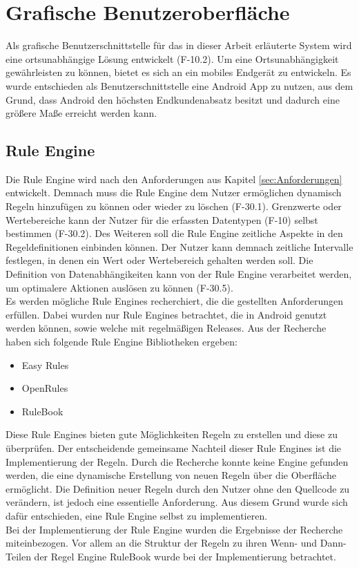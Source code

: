 \section{Grafische Benutzeroberfläche} %
Als grafische Benutzerschnittstelle für das in dieser Arbeit erläuterte System wird eine ortsunabhängige Lösung entwickelt (F-10.2). Um eine Ortsunabhängigkeit gewährleisten zu können, bietet es sich an ein mobiles Endgerät zu entwickeln. Es wurde  entschieden als Benutzerschnittstelle eine Android App zu nutzen, aus dem Grund, dass Android den höchsten Endkundenabsatz besitzt \cite{statista:marktanteileandroid} und dadurch eine größere Maße erreicht werden kann.
\subsection{Rule Engine}
Die Rule Engine wird nach den Anforderungen aus Kapitel \ref{sec:Anforderungen} entwickelt. Demnach muss die Rule Engine dem Nutzer ermöglichen dynamisch Regeln hinzufügen zu können oder wieder zu löschen (F-30.1). Grenzwerte oder Wertebereiche kann der Nutzer für die erfassten Datentypen (F-10) selbst bestimmen (F-30.2). Des Weiteren soll die Rule Engine zeitliche Aspekte in den Regeldefinitionen einbinden können. Der Nutzer kann demnach zeitliche Intervalle festlegen, in denen ein Wert oder Wertebereich gehalten werden soll. Die Definition von Datenabhängikeiten kann von der Rule Engine verarbeitet werden, um optimalere Aktionen auslösen zu können (F-30.5).\\
Es werden mögliche Rule Engines recherchiert, die die gestellten Anforderungen erfüllen. Dabei wurden nur Rule Engines betrachtet, die in Android genutzt werden können, sowie welche mit regelmäßigen Releases. Aus der Recherche haben sich folgende Rule Engine Bibliotheken ergeben:
\begin{itemize}
	\item Easy Rules \cite{github:easyrules}
	\item OpenRules \cite{openrules}
	\item RuleBook \cite{github:rulebook}
\end{itemize}
Diese Rule Engines bieten gute Möglichkeiten Regeln zu erstellen und diese zu überprüfen. Der entscheidende gemeinsame Nachteil dieser Rule Engines ist die Implementierung der Regeln. Durch die Recherche konnte keine Engine gefunden werden, die eine dynamische Erstellung von neuen Regeln über die Oberfläche ermöglicht. Die Definition neuer Regeln durch den Nutzer ohne den Quellcode zu verändern, ist jedoch eine essentielle Anforderung. Aus diesem Grund wurde sich dafür entschieden, eine Rule Engine selbst zu implementieren.\\
Bei der Implementierung der Rule Engine wurden die Ergebnisse der Recherche miteinbezogen. Vor allem an die Struktur der Regeln zu ihren Wenn- und Dann-Teilen der Regel Engine RuleBook wurde bei der Implementierung betrachtet.



